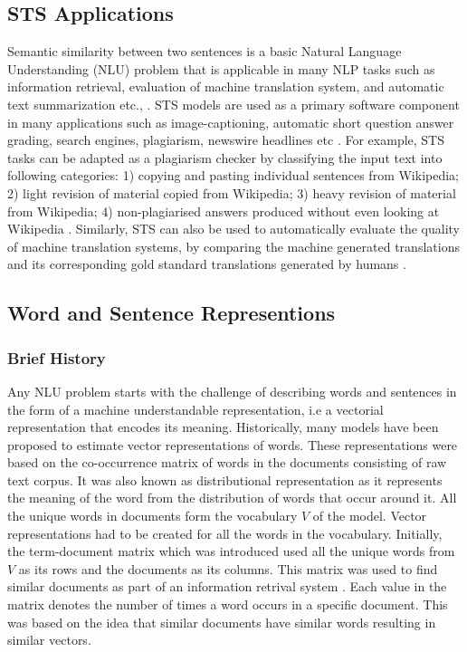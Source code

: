 \documentclass[12pt]{report} %
\begin{document}
\subsection{STS Applications}

Semantic similarity between two sentences is a basic Natural Language Understanding (NLU) problem that is applicable in many NLP tasks such as information retrieval, evaluation of machine translation system, and automatic text summarization etc., \citep{agirre2016semeval}. STS models are used as a primary software component in many applications such as image-captioning, automatic short question answer grading, search engines, plagiarism, newswire headlines etc \citep{agirre2016semeval}. For example, STS tasks can be adapted as a plagiarism checker by classifying the input text into following categories: 1) copying and pasting individual sentences
from Wikipedia; 2) light revision of material
copied from Wikipedia; 3) heavy revision of material
from Wikipedia; 4) non-plagiarised answers
produced without even looking at Wikipedia \citep{agirre2015semeval}. Similarly, STS can also be used to automatically evaluate the quality of machine translation systems, by comparing the machine generated translations and its corresponding gold standard translations generated by humans \cite{agirre2015semeval}. 

\subsection{Word and Sentence Representions}

\subsubsection{Brief History}

Any NLU problem starts with the challenge of describing words and sentences in the form of a machine understandable representation, i.e a vectorial representation that encodes its meaning. Historically, many models have been proposed to estimate vector representations of words. These representations were based on the co-occurrence matrix of words in the documents consisting of raw text corpus. It was also known as distributional representation as it represents the meaning of the word from the distribution of words that occur around it. All the unique words in documents form the vocabulary $V$ of the model. Vector representations had to be created for all the words in the vocabulary. Initially, the term-document matrix which was introduced used all the unique words from $V$ as its rows and the documents as its columns. This matrix was used to find similar documents as part of an information retrival system \citep{salton1971smart}. Each value in the matrix denotes the number of times a word occurs in a specific document.
This was based on the idea that similar documents have similar words resulting in similar vectors. 
\end{document}
